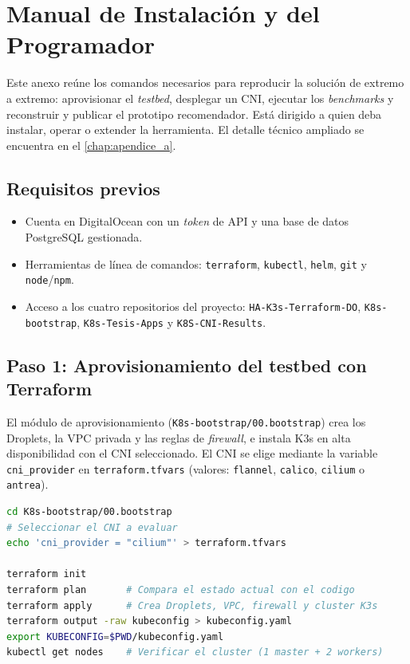 \chapter{Manual de Instalación y del Programador} \label{anexo:manual_instalacion}

Este anexo reúne los comandos necesarios para reproducir la solución de extremo a extremo: aprovisionar el \emph{testbed}, desplegar un CNI, ejecutar los \emph{benchmarks} y reconstruir y publicar el prototipo recomendador. Está dirigido a quien deba instalar, operar o extender la herramienta. El detalle técnico ampliado se encuentra en el \cref{chap:apendice_a}.

\section{Requisitos previos}

\begin{itemize}
\item Cuenta en DigitalOcean con un \emph{token} de API y una base de datos PostgreSQL gestionada.
\item Herramientas de línea de comandos: \texttt{terraform}, \texttt{kubectl}, \texttt{helm}, \texttt{git} y \texttt{node}/\texttt{npm}.
\item Acceso a los cuatro repositorios del proyecto: \texttt{HA-K3s-Terraform-DO}, \texttt{K8s-bootstrap}, \texttt{K8s-Tesis-Apps} y \texttt{K8S-CNI-Results}.
\end{itemize}

\section{Paso 1: Aprovisionamiento del testbed con Terraform}

El módulo de aprovisionamiento (\texttt{K8s-bootstrap/00.bootstrap}) crea los Droplets, la VPC privada y las reglas de \emph{firewall}, e instala K3s en alta disponibilidad con el CNI seleccionado. El CNI se elige mediante la variable \texttt{cni\_provider} en \texttt{terraform.tfvars} (valores: \texttt{flannel}, \texttt{calico}, \texttt{cilium} o \texttt{antrea}).

\begin{lstlisting}[language=bash]
cd K8s-bootstrap/00.bootstrap
# Seleccionar el CNI a evaluar
echo 'cni_provider = "cilium"' > terraform.tfvars

terraform init
terraform plan       # Compara el estado actual con el codigo
terraform apply      # Crea Droplets, VPC, firewall y cluster K3s
terraform output -raw kubeconfig > kubeconfig.yaml
export KUBECONFIG=$PWD/kubeconfig.yaml
kubectl get nodes    # Verificar el cluster (1 master + 2 workers)
\end{lstlisting}

